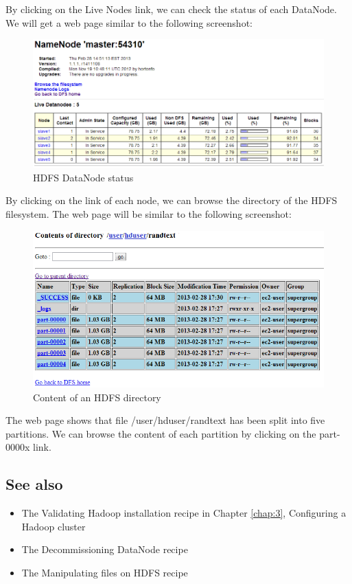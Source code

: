 By clicking on the Live Nodes link, we can check the status of each DataNode. We will get a web page similar to the following screenshot:
\begin{figure}[h]
  \centering
  \includegraphics[width=.9\textwidth]{figs/5163os_04_09.png}
  \caption{HDFS DataNode status}\label{fig:datanode.status}
\end{figure} 

By clicking on the link of each node, we can browse the directory of the HDFS filesystem. The web page will be similar to the following screenshot:

\begin{figure}[h]
  \centering
  \includegraphics[width=.8\textwidth]{figs/5163os_04_10.png}
  \caption{Content of an HDFS directory}\label{fig:content.hdfs}
\end{figure} 

The web page shows that file /user/hduser/randtext has been split into five partitions. We can browse the content of each partition by clicking on the part-0000x link.

\subsection*{See also}
\begin{itemize}
  \item The Validating Hadoop installation recipe in Chapter \ref{chap:3}, Configuring a Hadoop cluster
  \item The Decommissioning DataNode recipe
  \item The Manipulating files on HDFS recipe
\end{itemize}

